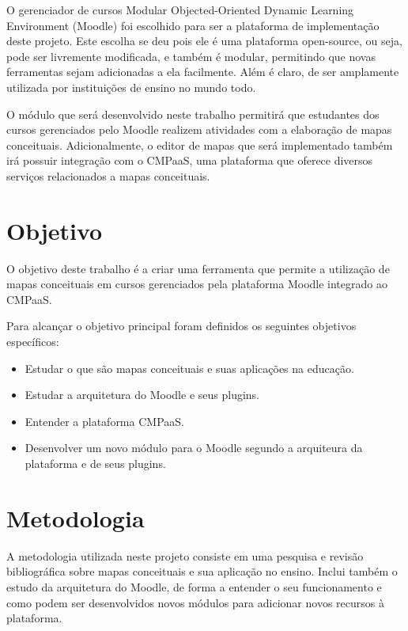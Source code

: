 \documentclass[
	12pt,				%
	openright,			%
	oneside,			%
	a4paper,			%
	english,			%
	french,				%
	spanish,			%
	brazil				%
	]{abntex2}
\begin{document}
O gerenciador de cursos Modular Objected-Oriented Dynamic Learning Environment (Moodle) foi escolhido para ser a plataforma de implementação deste projeto. Este escolha se deu pois ele é uma plataforma open-source, ou seja, pode ser livremente modificada, e também é modular, permitindo que novas ferramentas sejam adicionadas a ela facilmente. Além é claro, de ser amplamente utilizada por instituições de ensino no mundo todo.

O módulo que será desenvolvido neste trabalho permitirá que estudantes dos cursos gerenciados pelo Moodle realizem atividades com a elaboração de mapas conceituais. Adicionalmente, o editor de mapas que será implementado também irá possuir integração com o CMPaaS, uma plataforma que oferece diversos serviços relacionados a mapas conceituais.


\section{Objetivo}

O objetivo deste trabalho é a criar uma ferramenta que permite a utilização de mapas conceituais em cursos gerenciados pela plataforma Moodle integrado ao CMPaaS.

Para alcançar o objetivo principal foram definidos os seguintes objetivos específicos:

\begin{itemize}
	\item Estudar o que são mapas conceituais e suas aplicações na educação.
	\item Estudar a arquitetura do Moodle e seus plugins.
	\item Entender a plataforma CMPaaS.
	\item Desenvolver um novo módulo para o Moodle segundo a arquiteura da plataforma e de seus plugins.   
\end{itemize} 



\section{Metodologia}

A metodologia utilizada neste projeto consiste em uma pesquisa e revisão bibliográfica sobre mapas conceituais e sua aplicação no ensino. Inclui também o estudo da arquitetura do Moodle, de forma a entender o seu funcionamento e como podem ser desenvolvidos novos módulos para adicionar novos recursos à plataforma.
\end{document}
